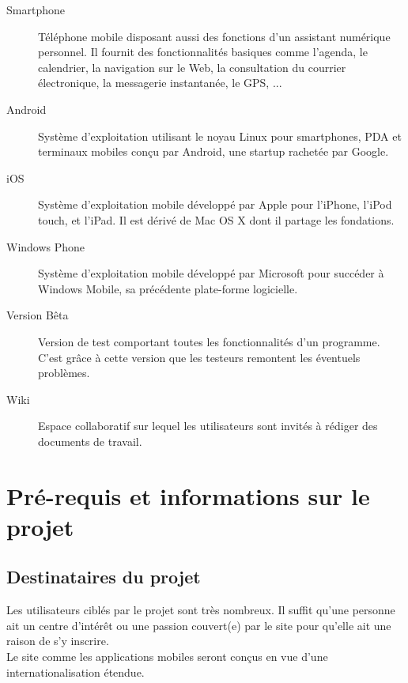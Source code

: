 \documentclass{life-fr}
\begin{document}
\begin{description}
\item[Smartphone]
Téléphone mobile disposant aussi des fonctions d'un assistant numérique personnel. Il fournit des fonctionnalités basiques comme l'agenda, le calendrier, la navigation sur le Web, la consultation du courrier électronique, la messagerie instantanée, le GPS, ...

\item[Android]
Système d’exploitation utilisant le noyau Linux pour smartphones, PDA et terminaux mobiles conçu par Android, une startup rachetée par Google.

\item[iOS]
Système d’exploitation mobile développé par Apple pour l'iPhone, l'iPod touch, et l'iPad. Il est dérivé de Mac OS X dont il partage les fondations.

\item[Windows Phone]
Système d’exploitation mobile développé par Microsoft pour succéder à Windows Mobile, sa précédente plate-forme logicielle.

\item[Version Bêta]
Version de test comportant toutes les fonctionnalités d'un programme. C'est grâce à cette version que les testeurs remontent les éventuels problèmes.

\item[Wiki]
Espace collaboratif sur lequel les utilisateurs sont invités à rédiger des documents de travail.


\end{description}



\section{Pré-requis et informations sur le projet}

\subsection{Destinataires du projet}

Les utilisateurs ciblés par le projet sont très nombreux. Il suffit qu'une personne ait un centre d'intérêt ou une passion couvert(e) par le site pour qu'elle ait une raison de s'y inscrire.\\

Le site comme les applications mobiles seront conçus en vue d'une internationalisation étendue.
\end{document}
